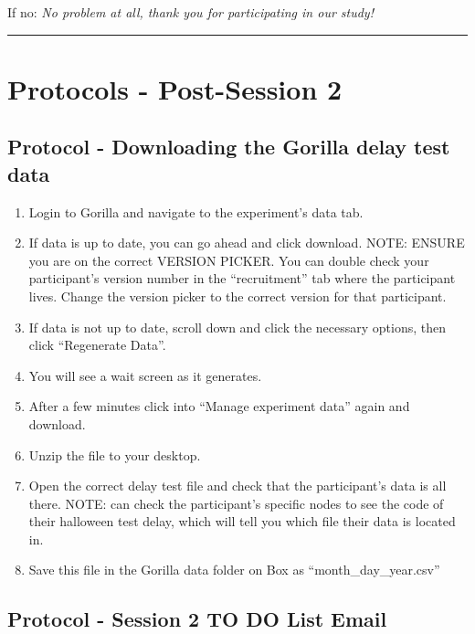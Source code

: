 \documentclass[]{book}
\begin{document}
If no: \emph{No problem at all, thank you for participating in our study!}

\begin{center}\rule{0.5\linewidth}{0.5pt}\end{center}

\hypertarget{protocols---post-session-2}{%
\section{Protocols - Post-Session 2}\label{protocols---post-session-2}}

\hypertarget{protocol---downloading-the-gorilla-delay-test-data}{%
\subsection{Protocol - Downloading the Gorilla delay test data}\label{protocol---downloading-the-gorilla-delay-test-data}}

\begin{enumerate}
\def\labelenumi{\arabic{enumi}.}
\item
  Login to Gorilla and navigate to the experiment's data tab.
\item
  If data is up to date, you can go ahead and click download. NOTE: ENSURE you are on the correct VERSION PICKER. You can double check your participant's version number in the ``recruitment'' tab where the participant lives. Change the version picker to the correct version for that participant.
\item
  If data is not up to date, scroll down and click the necessary options, then click ``Regenerate Data''.
\item
  You will see a wait screen as it generates.
\item
  After a few minutes click into ``Manage experiment data'' again and download.
\item
  Unzip the file to your desktop.
\item
  Open the correct delay test file and check that the participant's data is all there. NOTE: can check the participant's specific nodes to see the code of their halloween test delay, which will tell you which file their data is located in.
\item
  Save this file in the Gorilla data folder on Box as ``month\_day\_year.csv''
\end{enumerate}

\hypertarget{protocol---session-2-to-do-list-email}{%
\subsection{Protocol - Session 2 TO DO List Email}\label{protocol---session-2-to-do-list-email}}
\end{document}
